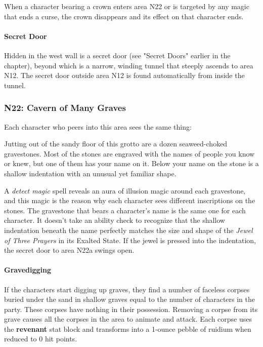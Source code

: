 \documentclass[letterpaper, 11pt, bg=full, twocolumn]{dndbook}
\begin{document}
When a character bearing a crown enters area N22 or is targeted by any magic that ends a curse, the crown disappears and its effect on that character ends.

\paragraph{Secret Door}

Hidden in the west wall is a secret door (see "Secret Doors" earlier in the chapter), beyond which is a narrow, winding tunnel that steeply ascends to area N12. The secret door outside area N12 is found automatically from inside the tunnel.

\subsubsection{N22: Cavern of Many Graves}

Each character who peers into this area sees the same thing:

\begin{DndReadAloud}
Jutting out of the sandy floor of this grotto are a dozen seaweed-choked gravestones. Most of the stones are engraved with the names of people you know or knew, but one of them has your name on it. Below your name on the stone is a shallow indentation with an unusual yet familiar shape.
\end{DndReadAloud}

A \textit{detect magic} spell reveals an aura of illusion magic around each gravestone, and this magic is the reason why each character sees different inscriptions on the stones. The gravestone that bears a character's name is the same one for each character. It doesn't take an ability check to recognize that the shallow indentation beneath the name perfectly matches the size and shape of the \textit{Jewel of Three Prayers} in its Exalted State. If the jewel is pressed into the indentation, the secret door to area N22a swings open.

\paragraph{Gravedigging}

If the characters start digging up graves, they find a number of faceless corpses buried under the sand in shallow graves equal to the number of characters in the party. These corpses have nothing in their possession. Removing a corpse from its grave causes all the corpses in the area to animate and attack. Each corpse uses the \textbf{revenant} stat block and transforms into a 1-ounce pebble of ruidium when reduced to 0 hit points.
\end{document}
